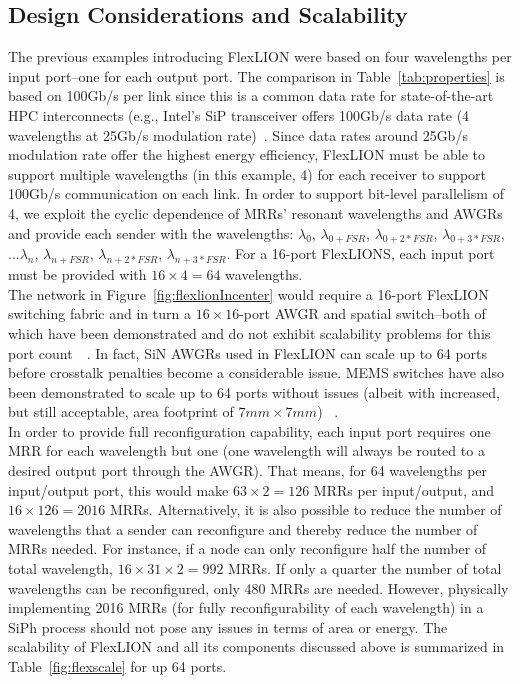 \subsection{Design Considerations and Scalability}
The previous examples introducing FlexLION were based on four wavelengths per input port--one for each output port. The comparison in Table~\ref{tab:properties} is based on 100Gb/s per link since this is a common data rate for state-of-the-art HPC interconnects (e.g., Intel's SiP transceiver offers 100Gb/s data rate (4 wavelengths at 25Gb/s modulation rate)~\cite{intelsip}. Since data rates around 25Gb/s modulation rate offer the highest energy efficiency, FlexLION must be able to support multiple wavelengths (in this example, 4) for each receiver to support 100Gb/s communication on each link. In order to support bit-level parallelism of 4, we exploit the cyclic dependence of MRRs' resonant wavelengths and AWGRs and provide each sender with the wavelengths: $\lambda_{0}$, $\lambda_{0+FSR}$, $\lambda_{0+2*FSR}$, $\lambda_{0+3*FSR}$, ...$\lambda_{n}$, $\lambda_{n+FSR}$, $\lambda_{n+2*FSR}$, $\lambda_{n+3*FSR}$. For a 16-port FlexLIONS, each input port must be provided with $16 \times 4 = 64$ wavelengths. \\
The network in Figure~\ref{fig:flexlionIncenter} would require a 16-port FlexLION switching fabric and in turn a $16 \times 16$-port AWGR and spatial switch--both of which have been demonstrated and do not exhibit scalability problems for this port count~\cite{shang2017low}~\cite{seok2016large}. In fact, SiN AWGRs used in FlexLION can scale up to 64 ports before crosstalk penalties become a considerable issue. MEMS switches have also been demonstrated to scale up to 64 ports without issues (albeit with increased, but still acceptable, area footprint of $7mm \times 7mm$) ~\cite{seok2016large}.\\
In order to provide full reconfiguration capability, each input port requires one MRR for each wavelength but one (one wavelength will always be routed to a desired output port through the AWGR). That means, for 64 wavelengths per input/output port, this would make $63 \times 2 = 126$ MRRs per input/output, and $16 \times 126 = 2016$ MRRs. Alternatively, it is also possible to reduce the number of wavelengths that a sender can reconfigure and thereby reduce the number of MRRs needed. For instance, if a node can only reconfigure half the number of total wavelength, $16 \times 31 \times 2 = 992$ MRRs. If only a quarter the number of total wavelengths can be reconfigured, only 480 MRRs are needed. However, physically implementing 2016 MRRs (for fully reconfigurability of each wavelength) in a SiPh process should not pose any issues in terms of area or energy. The scalability of FlexLION and all its components discussed above is summarized in Table~\ref{fig:flexscale} for up 64 ports. 
